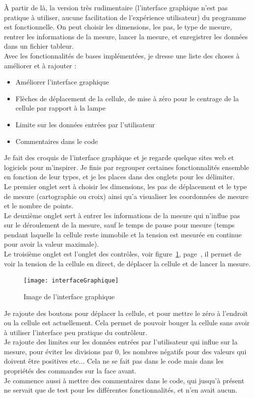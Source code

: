 \documentclass[12pt]{article}
\begin{document}
À partir de là, la version très rudimentaire (l'interface graphique n'est pas pratique à utiliser, aucune facilitation de l'expérience utilisateur) du programme est fonctionnelle.
On peut choisir les dimensions, les pas, le type de mesure, rentrer les informations de la mesure, lancer la mesure, et enregistrer les données dans un fichier tableur.\\
Avec les fonctionnalités de bases implémentées, je dresse une liste des choses à améliorer et à rajouter :
\begin{itemize}
	\item Améliorer l'interface graphique
	\item Flèches de déplacement de la cellule, de mise à zéro pour le centrage de la cellule par rapport à la lampe
	\item Limite sur les données entrées par l'utilisateur
	\item Commentaires dans le code
\end{itemize}
Je fait des croquis de l'interface graphique et je regarde quelque sites web et logiciels pour m'inspirer.
Je finis par regrouper certaines fonctionnalités ensemble en fonction de leur types, et je les places dans des onglets pour les délimiter.\\
Le premier onglet sert à choisir les dimensions, les pas de déplacement et le type de mesure (cartographie ou croix) ainsi qu'a visualiser les coordonnées de mesure et le nombre de points.\\
Le deuxième onglet sert à entrer les informations de la mesure qui n'influe pas sur le déroulement de la mesure, sauf le temps de pause pour mesure (temps pendant laquelle la cellule reste immobile et la tension est mesurée en continue pour avoir la valeur maximale).\\
Le troisième onglet est l'onglet des contrôles, voir figure~\ref{fig:interfaceGraphique}, page~\pageref{fig:interfaceGraphique}, il permet de voir la tension de la cellule en direct, de déplacer la cellule et de lancer la mesure.
\begin{figure}[h]
	\centering
	\texttt{[image: interfaceGraphique]}
	\caption{Image de l'interface graphique}
	\label{fig:interfaceGraphique}
\end{figure}
Je rajoute des boutons pour déplacer la cellule, et pour mettre le zéro à l'endroit ou la cellule est actuellement.
Cela permet de pouvoir bouger la cellule sans avoir à utiliser l'interface peu pratique du contrôleur.\\
Je rajoute des limites sur les données entrées par l'utilisateur qui influe sur la mesure, pour éviter les divisions par 0, les nombres négatifs pour des valeurs qui doivent être positives etc... Cela ne se fait pas dans le code mais dans les propriétés des commandes sur la face avant.\\
Je commence aussi à mettre des commentaires dans le code, qui jusqu'à présent ne servait que de test pour les différentes fonctionnalités, et n'en avait aucun.
\end{document}
